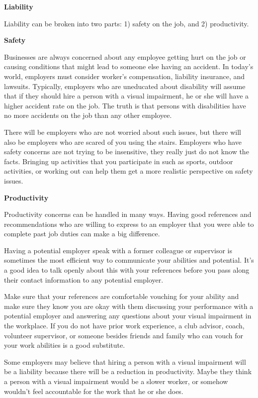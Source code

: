 \textbf{Liability}

Liability can be broken into two parts: 1) safety on the job, and 2) productivity.

\textbf{Safety}

Businesses are always concerned about any employee getting hurt on the job or causing conditions that might lead to someone else having an accident. In today's world, employers must consider worker's compensation, liability insurance, and lawsuits. Typically, employers who are uneducated about disability will assume that if they should hire a person with a visual impairment, he or she will have a higher accident rate on the job. The truth is that persons with disabilities have no more accidents on the job than any other employee.

There will be employers who are not worried about such issues, but there will also be employers who are scared of you using the stairs. Employers who have safety concerns are not trying to be insensitive, they really just do not know the facts. Bringing up activities that you participate in such as sports, outdoor activities, or working out can help them get a more realistic perspective on safety issues.

\textbf{Productivity}

Productivity concerns can be handled in many ways. Having good references and recommendations who are willing to express to an employer that you were able to complete past job duties can make a big difference.

Having a potential employer speak with a former colleague or supervisor is sometimes the most efficient way to communicate your abilities and potential. It's a good idea to talk openly about this with your references before you pass along their contact information to any potential employer.

Make sure that your references are comfortable vouching for your ability and make sure they know you are okay with them discussing your performance with a potential employer and answering any questions about your visual impairment in the workplace. If you do not have prior work experience, a club advisor, coach, volunteer supervisor, or someone besides friends and family who can vouch for your work abilities is a good substitute.

Some employers may believe that hiring a person with a visual impairment will be a liability because there will be a reduction in productivity. Maybe they think a person with a visual impairment would be a slower worker, or somehow wouldn't feel accountable for the work that he or she does.
 
